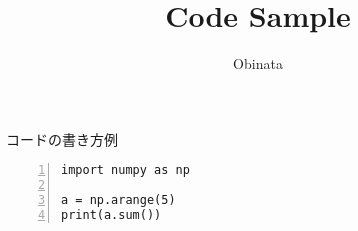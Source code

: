 \documentclass[10pt]{jsarticle}
\begin{document}
	\title{Code Sample}
	\author{Obinata}
	\date{}	
	\maketitle
	

	コードの書き方例
	\begin{lstlisting}[basicstyle=\ttfamily, frame=single,numbers=left]
import numpy as np

a = np.arange(5)
print(a.sum())
	\end{lstlisting}
	
\end{document}
